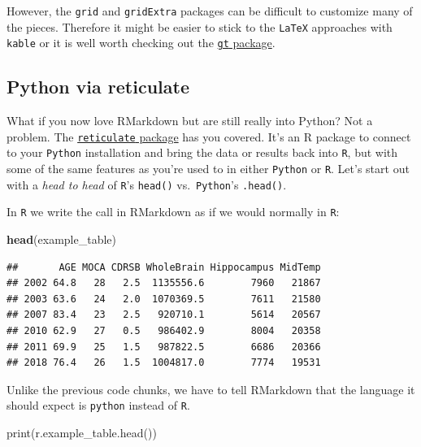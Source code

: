 \documentclass[]{article}
\newenvironment{Shaded}{\begin{snugshade}}{\end{snugshade}}
\newcommand{\BuiltInTok}[1]{#1}
\newcommand{\KeywordTok}[1]{\textcolor[rgb]{0.13,0.29,0.53}{\textbf{#1}}}
\newcommand{\NormalTok}[1]{#1}
\begin{document}
However, the \texttt{grid} and \texttt{gridExtra} packages can be
difficult to customize many of the pieces. Therefore it might be easier
to stick to the \texttt{LaTeX} approaches with \texttt{kable} or it is
well worth checking out the
\href{https://github.com/rstudio/gt}{\texttt{gt} package}.

\hypertarget{python-via-reticulate}{%
\subsection{Python via reticulate}\label{python-via-reticulate}}

What if you now love RMarkdown but are still really into Python? Not a
problem. The
\href{https://rstudio.github.io/reticulate/}{\texttt{reticulate}
package} has you covered. It's an R package to connect to your
\texttt{Python} installation and bring the data or results back into
\texttt{R}, but with some of the same features as you're used to in
either \texttt{Python} or \texttt{R}. Let's start out with a \emph{head
to head} of \texttt{R}'s \texttt{head()} vs.~\texttt{Python}'s
\texttt{.head()}.

In \texttt{R} we write the call in RMarkdown as if we would normally in
\texttt{R}:

\begin{Shaded}
\begin{Highlighting}[]
\KeywordTok{head}\NormalTok{(example_table)}
\end{Highlighting}
\end{Shaded}

\begin{verbatim}
##       AGE MOCA CDRSB WholeBrain Hippocampus MidTemp
## 2002 64.8   28   2.5  1135556.6        7960   21867
## 2003 63.6   24   2.0  1070369.5        7611   21580
## 2007 83.4   23   2.5   920710.1        5614   20567
## 2010 62.9   27   0.5   986402.9        8004   20358
## 2011 69.9   25   1.5   987822.5        6686   20366
## 2018 76.4   26   1.5  1004817.0        7774   19531
\end{verbatim}

Unlike the previous code chunks, we have to tell RMarkdown that the
language it should expect is \texttt{python} instead of \texttt{R}.

\begin{Shaded}
\begin{Highlighting}[]
\BuiltInTok{print}\NormalTok{(r.example_table.head())}
\end{Highlighting}
\end{Shaded}
\end{document}
